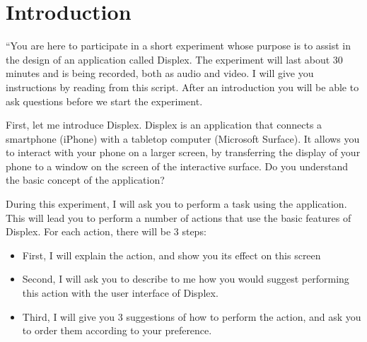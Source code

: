 %
%
%

\section{Introduction}
``You are here to participate in a short experiment whose purpose is to assist in the design of an application called Displex.
The experiment will last about 30 minutes and is being recorded, both as audio and video.
I will give you instructions by reading from this script.
After an introduction you will be able to ask questions before we start the experiment.

First, let me introduce Displex.
Displex is an application that connects a smartphone (iPhone) with a tabletop computer (Microsoft Surface).
It allows you to interact with your phone on a larger screen, by transferring the display of your phone to a window on the screen of the interactive surface.
Do you understand the basic concept of the application?

During this experiment, I will ask you to perform a task using the application.
This will lead you to perform a number of actions that use the basic features of Displex.
For each action, there will be 3 steps:

\begin{itemize}
\item{First, I will explain the action, and show you its effect on this screen}
\item{Second, I will ask you to describe to me how you would suggest performing this action with the user interface of Displex.}
\item{Third, I will give you 3 suggestions of how to perform the action, and ask you to order them according to your preference.}
\end{itemize}

